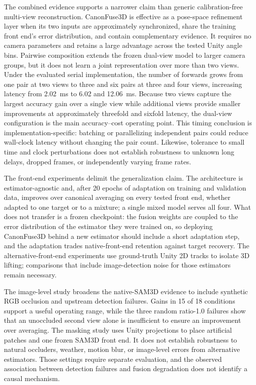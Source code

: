 \documentclass[preprint,12pt]{elsarticle}
\begin{document}
The combined evidence supports a narrower claim than generic calibration-free multi-view reconstruction. CanonFuse3D is effective as a pose-space refinement layer when its two inputs are approximately synchronized, share the training front end's error distribution, and contain complementary evidence. It requires no camera parameters and retains a large advantage across the tested Unity angle bins. Pairwise composition extends the frozen dual-view model to larger camera groups, but it does not learn a joint representation over more than two views. Under the evaluated serial implementation, the number of forwards grows from one pair at two views to three and six pairs at three and four views, increasing latency from 2.02~ms to 6.02 and 12.06~ms. Because two views capture the largest accuracy gain over a single view while additional views provide smaller improvements at approximately threefold and sixfold latency, the dual-view configuration is the main accuracy--cost operating point. This timing conclusion is implementation-specific: batching or parallelizing independent pairs could reduce wall-clock latency without changing the pair count. Likewise, tolerance to small time and clock perturbations does not establish robustness to unknown long delays, dropped frames, or independently varying frame rates.

The front-end experiments delimit the generalization claim. The architecture is estimator-agnostic and, after 20 epochs of adaptation on training and validation data, improves over canonical averaging on every tested front end, whether adapted to one target or to a mixture; a single mixed model serves all four. What does not transfer is a frozen checkpoint: the fusion weights are coupled to the error distribution of the estimator they were trained on, so deploying CanonFuse3D behind a new estimator should include a short adaptation step, and the adaptation trades native-front-end retention against target recovery. The alternative-front-end experiments use ground-truth Unity 2D tracks to isolate 3D lifting; comparisons that include image-detection noise for those estimators remain necessary.

The image-level study broadens the native-SAM3D evidence to include synthetic RGB occlusion and upstream detection failures. Gains in 15 of 18 conditions support a useful operating range, while the three random ratio-1.0 failures show that an unoccluded second view alone is insufficient to ensure an improvement over averaging. The masking study uses Unity projections to place artificial patches and one frozen SAM3D front end. It does not establish robustness to natural occluders, weather, motion blur, or image-level errors from alternative estimators. Those settings require separate evaluation, and the observed association between detection failures and fusion degradation does not identify a causal mechanism.
\end{document}
